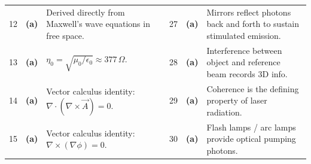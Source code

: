 \begin{table}[htbp]
\begin{tabularx}{\textwidth}{l c X l c X}
12 & \textbf{(a)} & Derived directly from Maxwell's wave equations in free space. & 27 & \textbf{(a)} & Mirrors reflect photons back and forth to sustain stimulated emission. \\
13 & \textbf{(a)} & $\eta_0 = \sqrt{\mu_0/\epsilon_0} \approx 377\,\Omega$. & 28 & \textbf{(a)} & Interference between object and reference beam records 3D info. \\
14 & \textbf{(a)} & Vector calculus identity: $\nabla \cdot (\nabla \times \vec{A}) = 0$. & 29 & \textbf{(a)} & Coherence is the defining property of laser radiation. \\
15 & \textbf{(a)} & Vector calculus identity: $\nabla \times (\nabla \phi) = 0$. & 30 & \textbf{(a)} & Flash lamps / arc lamps provide optical pumping photons. \\
\bottomrule
\end{tabularx}
\end{table}
